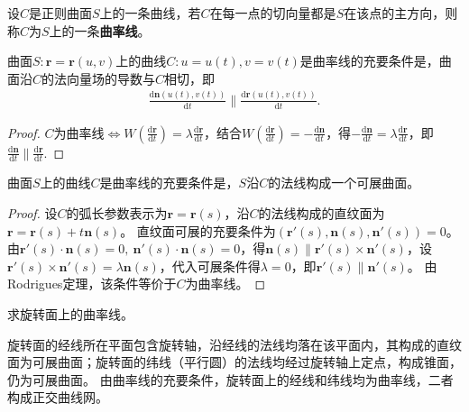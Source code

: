 \documentclass[../../main.tex]{subfiles}%
\begin{document}
\begin{definition}
设$C$是正则曲面$S$上的一条曲线，若$C$在每一点的切向量都是$S$在该点的主方向，则称$C$为$S$上的一条\textbf{曲率线}。
\end{definition}

\begin{theorem}[Rodrigues定理]
曲面$S:\boldsymbol{r}=\boldsymbol{r}(u,v)$上的曲线$C:u=u(t),v=v(t)$是曲率线的充要条件是，曲面沿$C$的法向量场的导数与$C$相切，即
\begin{align}
\frac{\mathrm{d}\boldsymbol{n}(u(t),v(t))}{\mathrm{d}t}\parallel\frac{\mathrm{d}\boldsymbol{r}(u(t),v(t))}{\mathrm{d}t}.\label{eq:rodrigues}
\end{align}
\end{theorem}
\begin{proof}
$C$为曲率线$\iff W\left(\frac{\mathrm{d}\boldsymbol{r}}{\mathrm{d}t}\right)=\lambda\frac{\mathrm{d}\boldsymbol{r}}{\mathrm{d}t}$，结合$W\left(\frac{\mathrm{d}\boldsymbol{r}}{\mathrm{d}t}\right)=-\frac{\mathrm{d}\boldsymbol{n}}{\mathrm{d}t}$，得$-\frac{\mathrm{d}\boldsymbol{n}}{\mathrm{d}t}=\lambda\frac{\mathrm{d}\boldsymbol{r}}{\mathrm{d}t}$，即$\frac{\mathrm{d}\boldsymbol{n}}{\mathrm{d}t}\parallel\frac{\mathrm{d}\boldsymbol{r}}{\mathrm{d}t}.$
\end{proof}

\begin{theorem}
曲面$S$上的曲线$C$是曲率线的充要条件是，$S$沿$C$的法线构成一个可展曲面。
\end{theorem}
\begin{proof}
设$C$的弧长参数表示为$\boldsymbol{r}=\boldsymbol{r}(s)$，沿$C$的法线构成的直纹面为$\boldsymbol{r}=\boldsymbol{r}(s)+t\boldsymbol{n}(s)$。
直纹面可展的充要条件为$(\boldsymbol{r}'(s),\boldsymbol{n}(s),\boldsymbol{n}'(s))=0$。
由$\boldsymbol{r}'(s)\cdot\boldsymbol{n}(s)=0,\ \boldsymbol{n}'(s)\cdot\boldsymbol{n}(s)=0$，得$\boldsymbol{n}(s)\parallel\boldsymbol{r}'(s)\times\boldsymbol{n}'(s)$，设$\boldsymbol{r}'(s)\times\boldsymbol{n}'(s)=\lambda\boldsymbol{n}(s)$，代入可展条件得$\lambda=0$，即$\boldsymbol{r}'(s)\parallel\boldsymbol{n}'(s)$。
由Rodrigues定理，该条件等价于$C$为曲率线。
\end{proof}

\begin{example}
求旋转面上的曲率线。
\end{example}
\begin{solution}
旋转面的经线所在平面包含旋转轴，沿经线的法线均落在该平面内，其构成的直纹面为可展曲面；旋转面的纬线（平行圆）的法线均经过旋转轴上定点，构成锥面，仍为可展曲面。
由曲率线的充要条件，旋转面上的经线和纬线均为曲率线，二者构成正交曲线网。

\end{solution}
\end{document}
